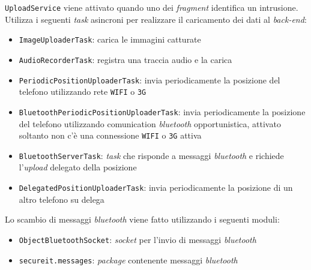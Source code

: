 \texttt{UploadService} viene attivato quando uno dei \textit{fragment} identifica un intrusione. Utilizza i seguenti \textit{task} asincroni per realizzare il caricamento dei dati al \textit{back-end}:
\begin{itemize}
	\item \texttt{ImageUploaderTask}: carica le immagini catturate
	\item \texttt{AudioRecorderTask}: registra una traccia audio e la carica
	\item \texttt{PeriodicPositionUploaderTask}: invia periodicamente la posizione del telefono utilizzando rete \texttt{WIFI} o \texttt{3G}
	\item \texttt{Bluetooth\allowbreak Periodic\allowbreak Position\allowbreak Uploader\allowbreak Task}: invia periodicamente la posizione del telefono utilizzando comunication \textit{bluetooth} opportunistica, attivato soltanto non c'è una connessione \texttt{WIFI} o \texttt{3G} attiva
	\item \texttt{BluetoothServerTask}: \textit{task} che risponde a messaggi \textit{bluetooth} e richiede l'\textit{upload} delegato della posizione
	\item \texttt{DelegatedPositionUploaderTask}: invia periodicamente la posizione di un altro telefono su delega
\end{itemize}

Lo scambio di messaggi \textit{bluetooth} viene fatto utilizzando i seguenti moduli:

\begin{itemize}
	\item \texttt{ObjectBluetoothSocket}: \textit{socket} per l'invio di messaggi \textit{bluetooth}
	\item \texttt{secureit.messages}: \textit{package} contenente messaggi \textit{bluetooth}
\end{itemize}


